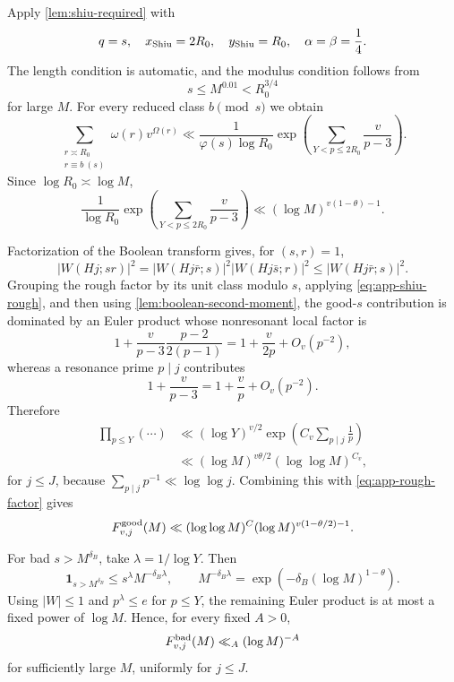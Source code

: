 \documentclass[11pt]{article}
\theoremstyle{definition}
\theoremstyle{remark}
\newcommand{\1}{\mathbf 1}
\newcommand{\Om}{\Omega}
\newcommand{\om}{\omega}
\newcommand{\ph}{\varphi}
\begin{document}
Apply \cref{lem:shiu-required} with
\[
q=s,
\quad x_{\rm Shiu}=2R_0,
\quad y_{\rm Shiu}=R_0,
\quad \alpha=\beta=\frac14.
\]
The length condition is automatic, and the modulus condition follows from
\[
s\le M^{0.01}<R_0^{3/4}
\]
for large $M$.  For every reduced class $b\pmod s$ we obtain
\begin{equation}\label{eq:app-shiu-rough}
\sum_{\substack{r\asymp R_0\\r\equiv b\ (s)}}
 \om(r)v^{\Om(r)}
\ll\frac1{\ph(s)\log R_0}
 \exp\!\left(\sum_{Y<p\le2R_0}\frac{v}{p-3}\right).
\end{equation}
Since $\log R_0\asymp\log M$,
\begin{equation}\label{eq:app-rough-factor}
\frac1{\log R_0}
 \exp\!\left(\sum_{Y<p\le2R_0}\frac{v}{p-3}\right)
\ll(\log M)^{v(1-\theta)-1}.
\end{equation}

Factorization of the Boolean transform gives, for $(s,r)=1$,
\[
|W(Hj;sr)|^2
=|W(Hj\bar r;s)|^2|W(Hj\bar s;r)|^2
\le |W(Hj\bar r;s)|^2.
\]
Grouping the rough factor by its unit class modulo $s$, applying \cref{eq:app-shiu-rough}, and then using \cref{lem:boolean-second-moment}, the good-$s$ contribution is dominated by an Euler product whose nonresonant local factor is
\[
1+\frac{v}{p-3}\frac{p-2}{2(p-1)}
=1+\frac{v}{2p}+O_v(p^{-2}),
\]
whereas a resonance prime $p\mid j$ contributes
\[
1+\frac{v}{p-3}=1+\frac vp+O_v(p^{-2}).
\]
Therefore
\begin{align}
\prod_{p\le Y}(\cdots)
&\ll(\log Y)^{v/2}
 \exp\!\left(C_v\sum_{p\mid j}\frac1p\right)\\
&\ll(\log M)^{v\theta/2}(\log\log M)^{C_v},
\label{eq:app-resonance-product}
\end{align}
for $j\le J$, because $\sum_{p\mid j}p^{-1}\ll\log\log j$.  Combining this with \cref{eq:app-rough-factor} gives
\begin{equation}\label{eq:app-good-second}
F_{v,j}^{\rm good}(M)
\ll(\log\log M)^C(\log M)^{v(1-\theta/2)-1}.
\end{equation}

For bad $s>M^{\delta_B}$, take $\lambda=1/\log Y$.  Then
\[
\mathbf1_{s>M^{\delta_B}}
\le s^\lambda M^{-\delta_B\lambda},
\qquad
M^{-\delta_B\lambda}
=\exp(-\delta_B(\log M)^{1-\theta}).
\]
Using $|W|\le1$ and $p^\lambda\le e$ for $p\le Y$, the remaining Euler product is at most a fixed power of $\log M$.  Hence, for every fixed $A>0$,
\begin{equation}\label{eq:app-bad-second}
F_{v,j}^{\rm bad}(M)\ll_A(\log M)^{-A}
\end{equation}
for sufficiently large $M$, uniformly for $j\le J$.
\end{document}
